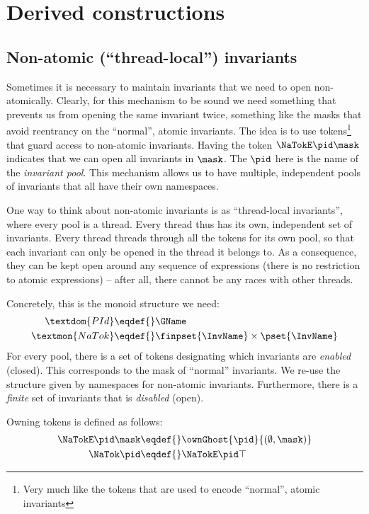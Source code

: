 \section{Derived constructions}

\subsection{Non-atomic (``thread-local'') invariants}

Sometimes it is necessary to maintain invariants that we need to open non-atomically.
Clearly, for this mechanism to be sound we need something that prevents us from opening the same invariant twice, something like the masks that avoid reentrancy on the ``normal'', atomic invariants.
The idea is to use tokens\footnote{Very much like the tokens that are used to encode ``normal'', atomic invariants} that guard access to non-atomic invariants.
Having the token $\NaTokE\pid\mask$ indicates that we can open all invariants in $\mask$.
The $\pid$ here is the name of the \emph{invariant pool}.
This mechanism allows us to have multiple, independent pools of invariants that all have their own namespaces.

One way to think about non-atomic invariants is as ``thread-local invariants'',
where every pool is a thread.
Every thread thus has its own, independent set of invariants.
Every thread threads through all the tokens for its own pool, so that each invariant can only be opened in the thread it belongs to.
As a consequence, they can be kept open around any sequence of expressions (\ie there is no restriction to atomic expressions) -- after all, there cannot be any races with other threads.

Concretely, this is the monoid structure we need:
\begin{align*}
\textdom{PId} \eqdef{}& \GName \\
\textmon{NaTok} \eqdef{}& \finpset{\InvName} \times \pset{\InvName}
\end{align*}
For every pool, there is a set of tokens designating which invariants are \emph{enabled} (closed).
This corresponds to the mask of ``normal'' invariants.
We re-use the structure given by namespaces for non-atomic invariants.
Furthermore, there is a \emph{finite} set of invariants that is \emph{disabled} (open).

Owning tokens is defined as follows:
\begin{align*}
\NaTokE\pid\mask \eqdef{}& \ownGhost{\pid}{ (\emptyset, \mask) } \\
\NaTok\pid \eqdef{}& \NaTokE\pid\top
\end{align*}

